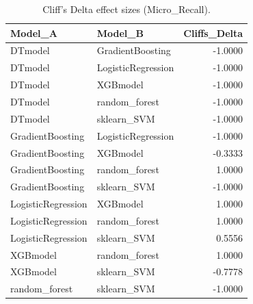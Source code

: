 \begin{table}[t]
\centering
\begin{tabular}{llr}
\toprule
Model_A & Model_B & Cliffs_Delta \\
\midrule
DTmodel & GradientBoosting & -1.0000 \\
DTmodel & LogisticRegression & -1.0000 \\
DTmodel & XGBmodel & -1.0000 \\
DTmodel & random_forest & -1.0000 \\
DTmodel & sklearn_SVM & -1.0000 \\
GradientBoosting & LogisticRegression & -1.0000 \\
GradientBoosting & XGBmodel & -0.3333 \\
GradientBoosting & random_forest & 1.0000 \\
GradientBoosting & sklearn_SVM & -1.0000 \\
LogisticRegression & XGBmodel & 1.0000 \\
LogisticRegression & random_forest & 1.0000 \\
LogisticRegression & sklearn_SVM & 0.5556 \\
XGBmodel & random_forest & 1.0000 \\
XGBmodel & sklearn_SVM & -0.7778 \\
random_forest & sklearn_SVM & -1.0000 \\
\bottomrule
\end{tabular}
\caption{Cliff's Delta effect sizes (Micro_Recall).}
\label{tab:cliffs_Micro_Recall}
\end{table}